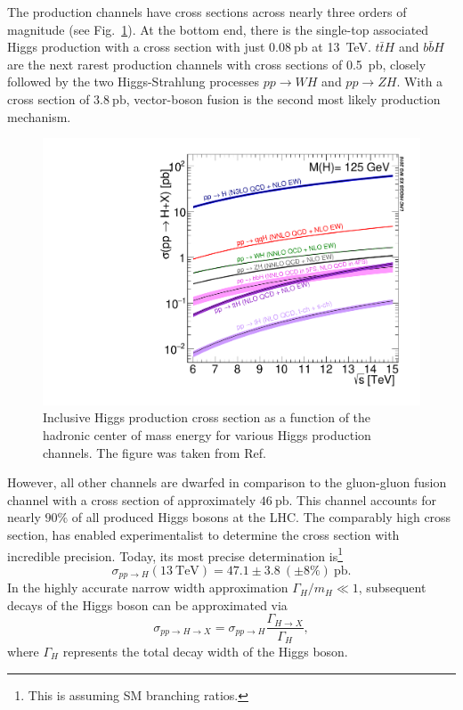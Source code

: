 The production channels have cross sections across nearly three orders of magnitude (see Fig.~\ref{fig:4:Escan}). At the bottom end, there is the single-top associated Higgs production with a cross section with just $0.08\ \text{pb}$ at 13~TeV. $t\bar{t}H$ and $b \bar{b}H$ are the next rarest production channels with cross sections of 0.5~pb, closely followed by the two Higgs-Strahlung processes $pp \rightarrow WH$ and $pp \rightarrow ZH$. With a cross section of $3.8\ \mathrm{pb}$, vector-boson fusion is the second most likely production mechanism.
\begin{figure}[h]
\centering
\includegraphics[scale=0.5]{Images/plot_Escan_H125_new_sqrt.pdf}
\caption{Inclusive Higgs production cross section as a function of the hadronic center of mass energy for various Higgs production channels. The figure was taken from Ref.~\cite{LHCHiggsCrossSectionWorkingGroup:2016ypw}}
\label{fig:4:Escan}
\end{figure}

However, all other channels are dwarfed in comparison to the gluon-gluon fusion channel with a cross section of approximately $46\ \mathrm{pb}$. This channel accounts for nearly $90\%$ of all produced Higgs bosons at the \acs{LHC}. The comparably high cross section, has enabled experimentalist to determine the cross section with incredible precision. Today, its most precise determination is\footnote{This is assuming \acs{SM} branching ratios.}~\cite{CMS:2022dwd}
\begin{equation}
\sigma_{pp \rightarrow H} (13\ \mathrm{TeV}) = 47.1 \pm 3.8\  (\pm 8\%) \ \mathrm{pb}.
\label{eq:2:xSec_pp2H_experiment}
\end{equation}
In the highly accurate narrow width approximation $\Gamma_H/m_H \ll 1$, subsequent decays of the Higgs boson can be approximated via
\begin{equation}
\sigma_{pp \rightarrow H \rightarrow X} = \sigma_{pp \rightarrow H} \frac{\Gamma_{H \rightarrow X}}{ \Gamma_H},
\label{eq:4:narrow_width_approximation}
\end{equation}
where $\Gamma_H$ represents the total decay width of the Higgs boson.

